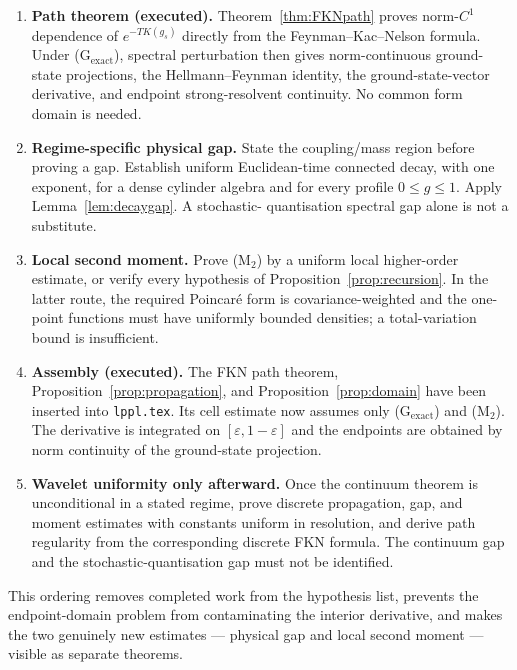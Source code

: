 \documentclass[11pt,a4paper]{article}
\theoremstyle{remark}
\begin{document}
\begin{enumerate}
\item \textbf{Path theorem (executed).}  Theorem~\ref{thm:FKNpath} proves norm-$C^1$
dependence of $e^{-TK(g_s)}$ directly from the Feynman--Kac--Nelson formula.  Under
(G$_\mathrm{exact}$), spectral perturbation then gives norm-continuous ground-state projections,
the Hellmann--Feynman identity, the ground-state-vector derivative, and endpoint
strong-resolvent continuity.  No common form domain is needed.

\item \textbf{Regime-specific physical gap.}  State the coupling/mass region before proving a
gap.  Establish uniform Euclidean-time connected decay, with one exponent, for a dense cylinder
algebra and for every profile $0\le g\le1$.  Apply Lemma~\ref{lem:decaygap}.  A stochastic-
quantisation spectral gap alone is not a substitute.

\item \textbf{Local second moment.}  Prove (M$_2$) by a uniform local higher-order estimate, or
verify every hypothesis of Proposition~\ref{prop:recursion}.  In the latter route, the required
Poincar\'e form is covariance-weighted and the one-point functions must have uniformly bounded
densities; a total-variation bound is insufficient.

\item \textbf{Assembly (executed).}  The FKN path theorem,
Proposition~\ref{prop:propagation}, and Proposition~\ref{prop:domain} have been inserted into
\texttt{lppl.tex}.  Its cell estimate now assumes only (G$_\mathrm{exact}$) and (M$_2$).
The derivative is integrated on $[\varepsilon,1-\varepsilon]$ and the endpoints are obtained by
norm continuity of the ground-state projection.

\item \textbf{Wavelet uniformity only afterward.}  Once the continuum theorem is unconditional
in a stated regime, prove discrete propagation, gap, and moment estimates with constants uniform
in resolution, and derive path regularity from the corresponding discrete FKN formula.  The
continuum gap and the stochastic-quantisation gap must not be identified.
\end{enumerate}

This ordering removes completed work from the hypothesis list, prevents the endpoint-domain
problem from contaminating the interior derivative, and makes the two genuinely new estimates
--- physical gap and local second moment --- visible as separate theorems.
\end{document}
